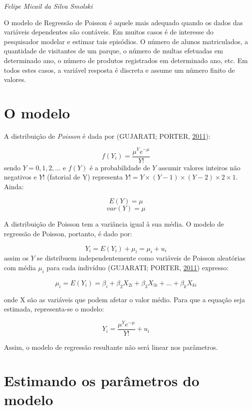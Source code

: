 \documentclass[12pt,brazil,oneside]{book}
\begin{document}
\emph{Felipe Micail da Silva Smolski}

\begin{flushright}
\emph{}
\end{flushright}

O modelo de Regressão de Poisson é aquele mais adequado quando os dados das variáveis dependentes são contáveis. Em muitos casos é de interesse do pesquisador modelar e estimar tais episódios. O número de alunos matriculados, a quantidade de visitantes de um parque, o número de multas efetuadas em determinado ano, o número de produtos registrados em determinado ano, etc. Em todos estes casos, a variável resposta é discreta e assume um número finito de valores.

\hypertarget{o-modelo-1}{%
\section{O modelo}\label{o-modelo-1}}

A distribuição de \emph{Poisson} é dada por (GUJARATI; PORTER, \protect\hyperlink{ref-Gujarati2011}{2011}):

\[
f(Y_i) = \frac{\mu^{Y}e^{-\mu}}{Y!}
\]
sendo \(Y=0,1,2,...\) e \(f(Y)\) é a probabilidade de \(Y\) assumir valores inteiros não negativos e \(Y!\) (fatorial de Y) representa \(Y! = Y \times (Y-1) \times (Y-2) \times 2 \times 1\). Ainda:

\[
E(Y) = \mu
\]
\[
var(Y) = \mu
\]

A distribuição de Poisson tem a variância igual à sua média. O modelo de regressão de Poisson, portanto, é dado por:

\[
Y_i = E(Y_i) +\mu_i = \mu_i + u_i
\]
assim os \(Y\) se distribuem independentemente como variáveis de Poisson aleatórias com média \(\mu_i\) para cada indivíduo (GUJARATI; PORTER, \protect\hyperlink{ref-Gujarati2011}{2011}) expresso:

\[
\mu_i = E(Y_i) = \beta_{i} + \beta _{2} X_{2i} + \beta_{3} X_{3i} + \dots + \beta_{k} X_{ki}
\]

onde X são as variáveis que podem afetar o valor médio. Para que a equação seja estimada, representa-se o modelo:

\[
Y_i = \frac{\mu^{Y}e^{-\mu}}{Y!} + u_i
\]

Assim, o modelo de regressão resultante não será linear nos parâmetros.

\hypertarget{estimando-os-parametros-do-modelo}{%
\section{Estimando os parâmetros do modelo}\label{estimando-os-parametros-do-modelo}}
\end{document}

